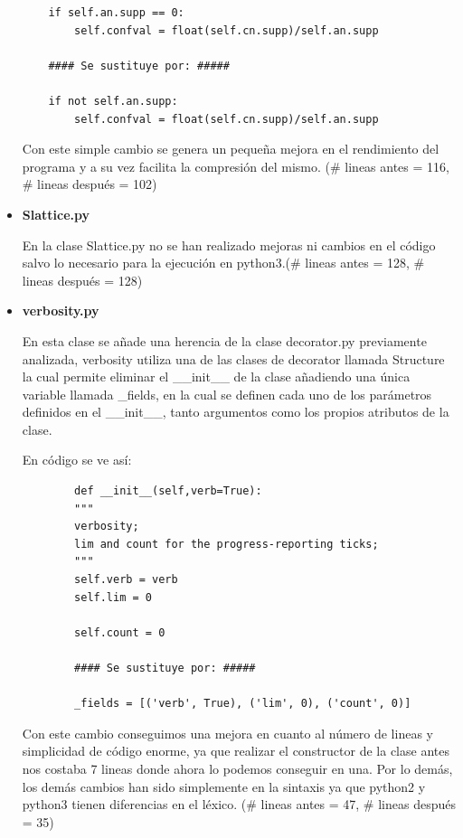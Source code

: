 \documentclass{cosas/tfg_domingo}
\begin{document}
\begin{itemize}
\begin{verbatim}
    if self.an.supp == 0:
        self.confval = float(self.cn.supp)/self.an.supp
        
    #### Se sustituye por: #####
    
    if not self.an.supp:
        self.confval = float(self.cn.supp)/self.an.supp
\end{verbatim}

Con este simple cambio se genera un pequeña mejora en el rendimiento del programa y a su vez facilita la compresión del mismo. (\# lineas antes = 116, \# lineas después = 102)

\item \textbf{Slattice.py}

En la clase Slattice.py no se han realizado mejoras ni cambios en el código salvo lo necesario para la ejecución en python3.(\# lineas antes = 128, \# lineas después = 128)
    
\item \textbf{verbosity.py}

En esta clase se añade una herencia de la clase decorator.py previamente analizada, verbosity utiliza una de las clases de decorator llamada Structure la cual permite eliminar el \_\_init\_\_ de la clase añadiendo una única variable llamada \_fields, en la cual se definen cada uno de los parámetros definidos en el \_\_init\_\_, tanto argumentos como los propios atributos de la clase.

En código se ve así:
\begin{verbatim}
        def __init__(self,verb=True):
        """
        verbosity;
        lim and count for the progress-reporting ticks;
        """
        self.verb = verb
        self.lim = 0
        
        self.count = 0
        
        #### Se sustituye por: #####
        
        _fields = [('verb', True), ('lim', 0), ('count', 0)]
\end{verbatim}

Con este cambio conseguimos una mejora en cuanto al número de lineas y simplicidad de código enorme, ya que realizar el constructor de la clase antes nos costaba 7 lineas donde ahora lo podemos conseguir en una. Por lo demás, los demás cambios han sido simplemente en la sintaxis ya que python2 y python3 tienen diferencias en el léxico. (\# lineas antes = 47, \# lineas después = 35)
\end{itemize}
\end{document}
